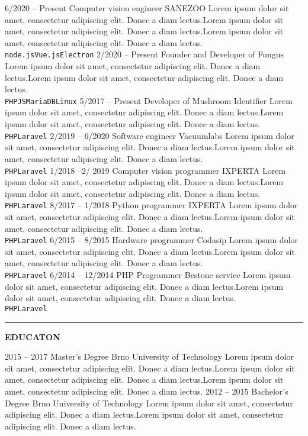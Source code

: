 \documentclass[10pt,A4]{article}
\newcommand{\cvsection}[2] {
\textcolor{sectcol}{\uppercase{\textbf{#1}}}
}
\newcommand{\cvsect}[4]{
	\textcolor{#3}{\hrule}
	\colorbox{#3}{ {\cvsection{#1}{#4}}}
}
\newcommand{\lorem}{Lorem ipsum dolor sit amet, consectetur adipiscing elit. Donec a diam lectus.}
\begin{document}
\begin{entrylist}
	\entry
		{6/2020 -- Present}
		{Computer vision engineer}
		{SANEZOO}
		{\lorem \lorem \lorem\\ \texttt{node.js}\slashsep\texttt{Vue.js}\slashsep\texttt{Electron}}
	\entry
		{2/2020 -- Present}
		{Founder and Developer of Fungus}
		{}
		{\lorem\lorem\\ \texttt{PHP}\slashsep\texttt{JS}\slashsep\texttt{MariaDB}\slashsep\texttt{Linux}}
	\entry
		{5/2017 -- Present}
		{Developer of Mushroom Identifier}
		{}
		{\lorem\lorem\\ \texttt{PHP}\slashsep\texttt{Laravel}}
	\entry
		{2/2019 -- 6/2020}
		{Software engineer}
		{Vacuumlabs}
		{\lorem\lorem\\ \texttt{PHP}\slashsep\texttt{Laravel}}
	\entry
		{1/2018 --2/ 2019}
		{Computer vision programmer}
		{IXPERTA}
		{\lorem\lorem\\ \texttt{PHP}\slashsep\texttt{Laravel}}
	\entry
		{8/2017 -- 1/2018}
		{Python programmer}
		{IXPERTA}
		{\lorem\lorem\\ \texttt{PHP}\slashsep\texttt{Laravel}}
	\entry
		{6/2015 -- 8/2015}
		{Hardware programmer}
		{Codasip}
		{\lorem\lorem\\ \texttt{PHP}\slashsep\texttt{Laravel}}
	\entry
		{6/2014 -- 12/2014}
		{PHP Programmer}
		{Bestone service}
		{\lorem\lorem\\ \texttt{PHP}\slashsep\texttt{Laravel}}
\end{entrylist}


\cvsect{Educaton}{0.49}{thirdcol}{textcol}\\[20pt]

\begin{entrylist}
	\entry
		{2015 -- 2017}
		{Master's Degree}
		{Brno University of Technology}
		{\lorem\lorem\lorem}
	\entry
		{2012 -- 2015}
		{Bachelor's Degree}
		{Brno University of Technology}
		{\lorem\lorem}
\end{entrylist}

\vfill
%
%
%
%
%
%
\end{document}
